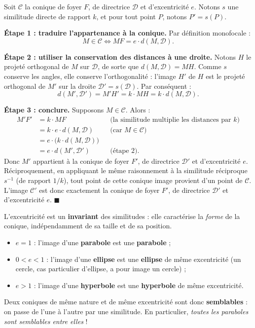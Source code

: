 \documentclass[11pt]{article}
\newcommand{\cle}[1]{{\popxbold\color{popdark}#1}}
\begin{document}
\begin{experience}
Soit $\mathcal{C}$ la conique de foyer $F$, de directrice $\mathcal{D}$ et d'excentricité $e$. Notons $s$ une similitude directe de rapport $k$, et pour tout point $P$, notons $P' = s(P)$.

\textbf{Étape 1 : traduire l'appartenance à la conique.} Par définition monofocale :
\[ M \in \mathcal{C} \iff MF = e \cdot d(M, \mathcal{D}). \]

\textbf{Étape 2 : utiliser la conservation des distances à une droite.} Notons $H$ le projeté orthogonal de $M$ sur $\mathcal{D}$, de sorte que $d(M,\mathcal{D}) = MH$. Comme $s$ conserve les angles, elle conserve l'orthogonalité : l'image $H'$ de $H$ est le projeté orthogonal de $M'$ sur la droite $\mathcal{D}' = s(\mathcal{D})$. Par conséquent :
\[ d(M', \mathcal{D}') = M'H' = k \cdot MH = k \cdot d(M, \mathcal{D}). \]

\textbf{Étape 3 : conclure.} Supposons $M \in \mathcal{C}$. Alors :
\begin{align*}
M'F' &= k \cdot MF & &\text{(la similitude multiplie les distances par } k\text{)}\\
&= k \cdot e \cdot d(M, \mathcal{D}) & &\text{(car } M \in \mathcal{C}\text{)}\\
&= e \cdot \big(k \cdot d(M, \mathcal{D})\big) & &\\
&= e \cdot d(M', \mathcal{D}') & &\text{(étape 2).}
\end{align*}
Donc $M'$ appartient à la conique de foyer $F'$, de directrice $\mathcal{D}'$ et d'excentricité $e$. Réciproquement, en appliquant le même raisonnement à la similitude réciproque $s^{-1}$ (de rapport $1/k$), tout point de cette conique image provient d'un point de $\mathcal{C}$. L'image $\mathcal{C}'$ est donc exactement la conique de foyer $F'$, de directrice $\mathcal{D}'$ et d'excentricité $e$. \hfill$\blacksquare$
\end{experience}

\begin{aretenir}
L'\cle{excentricité} est un \textbf{invariant} des similitudes : elle caractérise la \emph{forme} de la conique, indépendamment de sa taille et de sa position.
\begin{itemize}
\item $e = 1$ : l'image d'une \textbf{parabole} est une \textbf{parabole} ;
\item $0 < e < 1$ : l'image d'une \textbf{ellipse} est une \textbf{ellipse} de même excentricité (un cercle, cas particulier d'ellipse, a pour image un cercle) ;
\item $e > 1$ : l'image d'une \textbf{hyperbole} est une \textbf{hyperbole} de même excentricité.
\end{itemize}
Deux coniques de même nature et de même excentricité sont donc \textbf{semblables} : on passe de l'une à l'autre par une similitude. En particulier, \emph{toutes les paraboles sont semblables entre elles} !
\end{aretenir}
\end{document}
